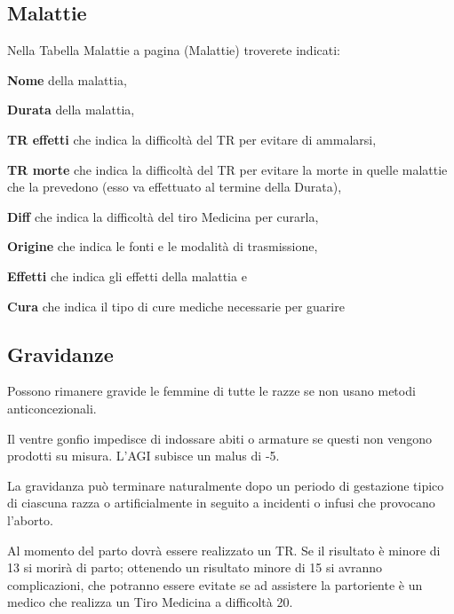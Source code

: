 \subsection{Malattie} Nella Tabella Malattie a pagina \pageref{tabmalattie}
(Malattie) troverete indicati: 
\begin{description}

\item{\textbf{Nome}} della malattia,
\item{\textbf{Durata}} della malattia,
\item{\textbf{TR effetti}} che indica la difficolt\`a del TR per
  evitare di ammalarsi,
\item{\textbf{TR morte}} che indica la difficolt\`a del TR per
  evitare la morte in quelle malattie che la prevedono (esso va
  effettuato al termine della Durata),
\item{\textbf{Diff}} che indica la difficolt\`a del tiro Medicina
  per curarla,
\item{\textbf{Origine}} che indica le fonti e le modalit\`a di
  trasmissione,
\item{\textbf{Effetti}} che indica gli effetti della malattia e
\item{\textbf{Cura}} che indica il tipo di cure mediche necessarie per
  guarire
\end{description}

\subsection{Gravidanze} 

Possono rimanere gravide le femmine di tutte le razze se non usano
metodi anticoncezionali.

Il ventre gonfio impedisce di indossare abiti o armature se questi non
vengono prodotti su misura. L'AGI subisce un malus di -5.

La gravidanza pu\`o terminare naturalmente dopo un periodo di
gestazione tipico di ciascuna razza o artificialmente in seguito a
incidenti o infusi che provocano l'aborto.

Al momento del parto dovr\`a essere realizzato un TR. Se il risultato
\`e minore di 13 si morir\`a di parto; ottenendo un risultato minore
di 15 si avranno complicazioni, che potranno essere evitate se ad
assistere la partoriente \`e un medico che realizza un Tiro Medicina a
difficolt\`a 20.

